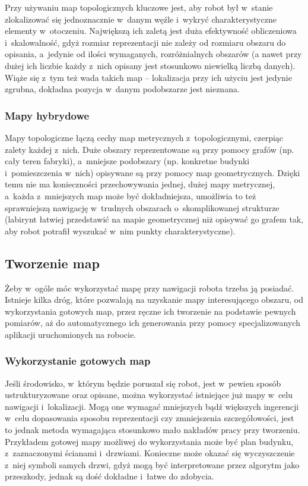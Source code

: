 Przy używaniu map topologicznych kluczowe jest, aby robot był w~stanie zlokalizować
się jednoznacznie w~danym węźle i~wykryć charakterystyczne elementy w~otoczeniu.
Największą ich zaletą jest duża efektywność obliczeniowa i~skalowalność, gdyż rozmiar
reprezentacji nie zależy od rozmiaru obszaru do opisania, a~jedynie od ilości wymaganych,
rozróżnialnych obszarów (a nawet przy dużej ich liczbie każdy z~nich opisany jest
stosunkowo niewielką liczbą danych). Wiąże się z~tym też wada takich map -- lokalizacja
przy ich użyciu jest jedynie zgrubna, dokładna pozycja w~danym podobszarze jest nieznana.

\subsubsection{Mapy hybrydowe}

Mapy topologiczne łączą cechy map metrycznych z~topologicznymi, czerpiąc zalety każdej z~nich.
Duże obszary reprezentowane są przy pomocy grafów (np. cały teren fabryki), a~mniejsze
podobszary (np. konkretne budynki i~pomieszczenia w~nich) opisywane są przy pomocy
map geometrycznych. Dzięki temu nie ma konieczności przechowywania jednej, dużej
mapy metrycznej, a~każda z~mniejszych map może być dokładniejsza, umożliwia to też
sprawniejszą nawigację w~trudnych obszarach o~skomplikowanej strukturze (labirynt
łatwiej przedstawić na mapie geometrycznej niż opisywać go grafem tak, aby robot potrafił
wyszukać w~nim punkty charakterystyczne).

\subsection{Tworzenie map}

Żeby w~ogóle móc wykorzystać mapę przy nawigacji robota trzeba ją posiadać.
Istnieje kilka dróg, które pozwalają na uzyskanie mapy interesującego obszaru,
od wykorzystania gotowych map, przez ręczne ich tworzenie na podstawie pewnych
pomiarów, aż do automatycznego ich generowania przy pomocy specjalizowanych
aplikacji uruchomionych na robocie.

\subsubsection{Wykorzystanie gotowych map}

Jeśli środowisko, w~którym będzie poruszał się robot, jest w~pewien sposób
ustrukturyzowane oraz opisane, można wykorzystać istniejące już mapy w~celu
nawigacji i~lokalizacji. Mogą one wymagać mniejszych bądź większych ingerencji
w~celu dopasowania sposobu reprezentacji czy zmniejszenia szczegółowości,
jest to jednak metoda wymagająca stosunkowo mało nakładów pracy przy tworzeniu.
Przykładem gotowej mapy możliwej do wykorzystania może być plan budynku,
z~zaznaczonymi ścianami i~drzwiami. Konieczne może okazać się wyczyszczenie
z~niej symboli samych drzwi, gdyż mogą być interpretowane przez algorytm
jako przeszkody, jednak są dość dokładne i~łatwe do zdobycia.

